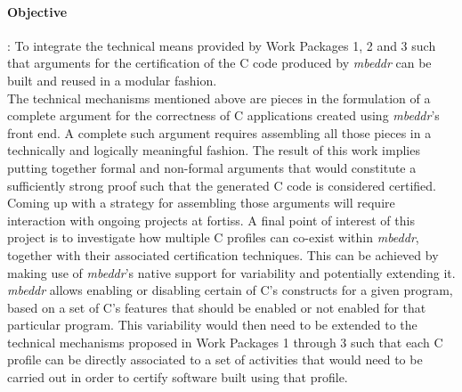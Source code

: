 \paragraph{\textbf{Objective}}: To integrate the technical means provided by
Work Packages 1, 2 and 3 such that arguments for the certification of the C code
produced by \emph{mbeddr} can be built and reused in a modular
fashion.\vspace{.2cm}\\
The technical mechanisms mentioned above are pieces in the formulation of a
complete argument for the correctness of C applications created using
\emph{mbeddr}’s front end.
A complete such argument requires assembling all those pieces in a technically and logically meaningful fashion. The result of
this work implies putting together formal and non-formal arguments that would
constitute a sufficiently strong proof such that the generated C code is considered certified.
Coming up with a strategy for assembling those arguments will require
interaction with ongoing projects at fortiss. A final point of interest of this project is to
investigate how multiple C profiles can co-exist within \emph{mbeddr}, together with their associated certification techniques. This can
be achieved by making use of \emph{mbeddr}’s native support for variability and
potentially extending it. \emph{mbeddr} allows enabling or disabling certain
of C’s constructs for a given program, based on a set of C's features that
should be enabled or not enabled for that particular program.
This variability would then need to be extended to the technical mechanisms
proposed in Work Packages 1 through 3 such that each C profile can be directly
associated to a set of activities that would need to be carried out in order to
certify software built using that profile.

